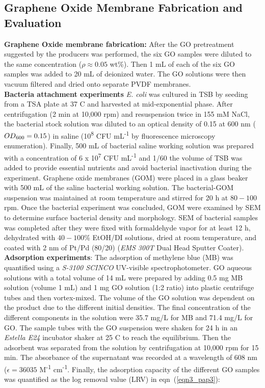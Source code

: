 \subsection{Graphene Oxide Membrane Fabrication and Evaluation}
\textbf{Graphene Oxide membrane fabrication:} After the GO pretreatment suggested by the producers was performed, the six GO samples were diluted to the same concentration ($\rho\approx0.05$ wt\%). Then 1 mL of each of the six GO samples was added to 20 mL of deionized water. The GO solutions were then vacuum filtered and dried onto separate PVDF membranes.\\
\textbf{Bacteria attachment experiments}
\textit{E. coli} was cultured in TSB by seeding from a TSA plate at 37 \textdegree C and harvested at mid-exponential phase. After centrifugation (2 min at 10,000 rpm) and resuspension twice in 155 mM NaCl, the bacterial stock solution was diluted to an optical density of 0.15 at 600 nm ($OD\textsubscript{600}=0.15$) in saline (10\textsuperscript{8} CFU mL\textsuperscript{-1} by fluorescence microscopy enumeration).\cite{zhang2017interlaced} Finally, 500 mL of bacterial saline working solution was prepared with a concentration of 6 x 10\textsuperscript{7} CFU mL\textsuperscript{-1} and 1/60 the volume of TSB was added to provide essential nutrients and avoid bacterial inactivation during the experiment. Graphene oxide membranes (GOM) were placed in a glass beaker with 500 mL of the saline bacterial working solution. The bacterial-GOM suspension was maintained at room temperature and stirred for 20 h at $80-100$ rpm. Once the bacterial experiment was concluded, GOM were examined by SEM to determine surface bacterial density and morphology. SEM of bacterial samples was completed after they were fixed with formaldehyde vapor for at least 12 h, dehydrated with $40-100$\% EtOH/DI solutions, dried at room temperature, and coated with 2 nm of Pt/Pd (80/20) (\textit{EMS 300T} Dual Head Sputter Coater).\\
\textbf{Adsorption experiments}: The adsorption of methylene blue (MB) was quantified using a \textit{S-3100 SCINCO} UV-visible spectrophotometer. GO aqueous solutions with a total volume of 14 mL were prepared by adding 0.5 mg MB solution (volume 1 mL) and 1 mg GO solution (1:2 ratio) into plastic centrifuge tubes and then vortex-mixed. The volume of the GO solution was dependent on the product due to the different initial densities. The final concentration of the different components in the solution were 35.7 mg/L for MB and 71.4 mg/L for GO. The sample tubes with the GO suspension were shaken for 24 h in an \textit{Estella E24} incubator shaker at 25 \textdegree C to reach the equilibrium. Then the adsorbent was separated from the solution by centrifugation at 10,000 rpm for 15 min. The absorbance of the supernatant was recorded at a wavelength of 608 nm ($\epsilon=36035$ M\textsuperscript{-1} cm\textsuperscript{-1}. Finally, the adsorption capacity of the different GO samples was quantified as the log removal value (LRV) in eqn~(\ref{eqn3_pap3}): 

